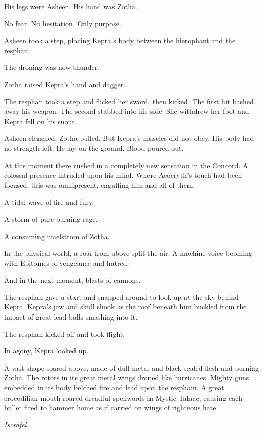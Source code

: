 \documentclass
  [a4paper,
   12pt,
   oneside
  ]%
  {article}
\begin{document}
His legs were Asheen. 
His hand was Zotha. 

No fear. 
No hesitation.
Only purpose.

Asheen took a step, placing Kepra's body between the hierophant and the resphan.

The droning was now thunder.

Zotha raised Kepra's hand and dagger. 

The resphan took a step and flicked her sword, then kicked. The first hit bashed away his weapon. The second stabbed into his side. 
She withdrew her foot and
Kepra fell on his snout. 

Asheen clenched. Zotha pulled. But Kepra's muscles did not obey.
His body had no strength left.
He lay on the ground.
Blood poured out.

At this moment there rushed in a completely new sensation in the Concord. 
A colossal presence intruded upon his mind.
Where Aeocryth's touch had been focused, this was omnipresent, engulfing him and all of them.

A tidal wave of fire and fury. 

A storm of pure burning rage.

A consuming maelstrom of Zotha.

In the physical world, a roar from above split the air. 
A machine voice booming with Epitomes of vengeance and hatred.

And in the next moment, blasts of cannons. 

The resphan gave a start and snapped around to look up at the sky behind Kepra. 
Kepra's jaw and skull shook as the roof beneath him buckled from the impact of great lead balls smashing into it. 

The resphan kicked off and took flight. 

In agony, Kepra looked up. 

A vast shape soared above, made of dull metal and black-scaled flesh and burning Zotha. 
The rotors in its great metal wings droned like hurricanes. 
Mighty guns embedded in its body belched fire and lead upon the resphain. 
A great crocodilian mouth roared dreadful spellwords in Mystic Talaac, causing each bullet fired to hammer home as if carried on wings of righteous hate. 

\emph{Iscrafel.} 
\end{document}
